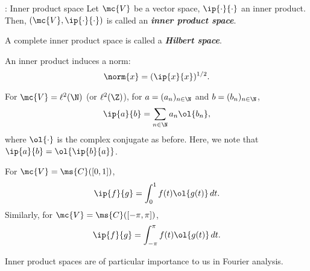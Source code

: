 \begin{ndef}{: Inner product space}
    Let \(\mc{V}\) be a vector space, \(\ip{\cdot}{\cdot}\) an inner product. Then, \((\mc{V},\ip{\cdot}{\cdot})\) is called an \emph{\textbf{inner product space}}.

    \medskip

    A complete inner product space is called a \emph{\textbf{Hilbert space}}.
\end{ndef}
\begin{note}
    An inner product induces a norm:
    \begin{equation*} 
        \norm{x}=(\ip{x}{x})^{1/2}.
    \end{equation*}
\end{note}
\begin{example}
    For \(\mc{V}=\ell^2(\N)\) (or \(\ell^2(\Z)\)), for \(a=(a_n)_{n\in\N}\) and \(b=(b_n)_{n\in\N}\), 
    \begin{equation*} 
        \ip{a}{b}=\sum_{n\in\N} a_n\ol{b_n},
    \end{equation*}
    where \(\ol{\cdot}\) is the complex conjugate as before. Here, we note that \(\ip{a}{b}=\ol{\ip{b}{a}}\).
\end{example}
\begin{example}
    For \(\mc{V}=\ms{C}([0,1])\), 
    \begin{equation*} 
        \ip{f}{g}=\int_0^1 f(t)\ol{g(t)} \, dt.
    \end{equation*}
    Similarly, for \(\mc{V}=\ms{C}([-\pi,\pi])\),
    \begin{equation*} 
        \ip{f}{g}=\int_{-\pi}^{\pi} f(t)\ol{g(t)} \, dt.
    \end{equation*}
\end{example}
Inner product spaces are of particular importance to us in Fourier analysis.

